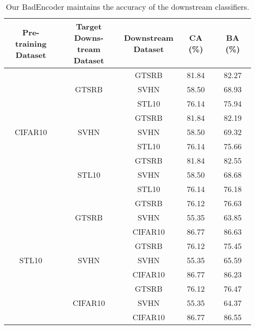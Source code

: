 \begin{table}[tp]\renewcommand{\arraystretch}{1.2} 
	\centering
	\caption{Our BadEncoder maintains the accuracy of the downstream classifiers. }
	\setlength{\tabcolsep}{1mm}
	{
	\begin{tabular}{|c|c|c|c|c|}
		\hline
	\makecell{Pre-training \\Dataset} & \makecell{Target  Downs-\\tream Dataset} & \makecell{Downstream \\Dataset} & CA (\%) & BA (\%)  \\ \hline
	\multirow{9}{*}{CIFAR10}
	&	\multirow{3}{*}{GTSRB} 
	    & GTSRB & 81.84 & 82.27 \\ \cline{3-5} 
	    && SVHN & 58.50 & 68.93  \\ \cline{3-5} 
	    && STL10 & 76.14 & 75.94  \\ \cline{2-5} 
	&	\multirow{3}{*}{SVHN} 
	    & GTSRB & 81.84 & 82.19  \\ \cline{3-5} 
	    &&	SVHN & 58.50 & 69.32 \\ \cline{3-5} 
	    && STL10 & 76.14 & 75.66  \\ \cline{2-5}   
	&	\multirow{3}{*}{STL10} 
	    & GTSRB & 81.84 & 82.55  \\ \cline{3-5}  
	    && SVHN & 58.50 & 68.68  \\ \cline{3-5} 
	    &&	STL10 & 76.14 & 76.18 \\ \hline
	    
	\multirow{9}{*}{STL10}
	&	\multirow{3}{*}{GTSRB} 
		&	GTSRB & 76.12 & 76.63  \\ \cline{3-5} 
	    && SVHN & 55.35 & 63.85  \\ \cline{3-5} 
	    && CIFAR10 & 86.77 & 86.63  \\ \cline{2-5} 
	&	\multirow{3}{*}{SVHN} 
	    & GTSRB & 76.12 & 75.45  \\ \cline{3-5} 
	    &&	SVHN & 55.35 & 65.59 \\ \cline{3-5} 
	    && CIFAR10 & 86.77 & 86.23 \\ \cline{2-5}   
	&	\multirow{3}{*}{CIFAR10} 
	    & GTSRB & 76.12 & 76.47  \\ \cline{3-5}  
	    && SVHN & 55.35 & 64.37 \\ \cline{3-5}  
	    &&	CIFAR10 & 86.77 & 86.55  \\ \hline
	\end{tabular}
	}
	\label{maintail_utility_table}
	\vspace{-5mm}
\end{table}







